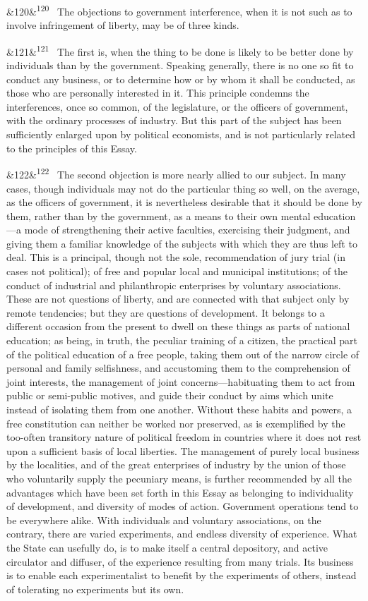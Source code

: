 \documentclass[12pt]{article}
\newcommand{\para}[1][]{\par\noindent\ifx&#1&\else\textsuperscript{\footnotesize #1}~\fi}
\begin{document}
\para[120] The objections to government interference, when it is not such as to involve infringement of liberty, may be of three kinds.

\para[121] The first is, when the thing to be done is likely to be better done by individuals than by the government. Speaking generally, there is no one so fit to conduct any business, or to determine how or by whom it shall be conducted, as those who are personally interested in it. This principle condemns the interferences, once so common, of the legislature, or the officers of government, with the ordinary processes of industry. But this part of the subject has been sufficiently enlarged upon by political economists, and is not particularly related to the principles of this Essay.

\para[122] The second objection is more nearly allied to our subject. In many cases, though individuals may not do the particular thing so well, on the average, as the officers of government, it is nevertheless desirable that it should be done by them, rather than by the government, as a means to their own mental education---a mode of strengthening their active faculties, exercising their judgment, and giving them a familiar knowledge of the subjects with which they are thus left to deal. This is a principal, though not the sole, recommendation of jury trial (in cases not political); of free and popular local and municipal institutions; of the conduct of industrial and philanthropic enterprises by voluntary associations. These are not questions of liberty, and are connected with that subject only by remote tendencies; but they are questions of development. It belongs to a different occasion from the present to dwell on these things as parts of national education; as being, in truth, the peculiar training of a citizen, the practical part of the political education of a free people, taking them out of the narrow circle of personal and family selfishness, and accustoming them to the comprehension of joint interests, the management of joint concerns---habituating them to act from public or semi-public motives, and guide their conduct by aims which unite instead of isolating them from one another. Without these habits and powers, a free constitution can neither be worked nor preserved, as is exemplified by the too-often transitory nature of political freedom in countries where it does not rest upon a sufficient basis of local liberties. The management of purely local business by the localities, and of the great enterprises of industry by the union of those who voluntarily supply the pecuniary means, is further recommended by all the advantages which have been set forth in this Essay as belonging to individuality of development, and diversity of modes of action. Government operations tend to be everywhere alike. With individuals and voluntary associations, on the contrary, there are varied experiments, and endless diversity of experience. What the State can usefully do, is to make itself a central depository, and active circulator and diffuser, of the experience resulting from many trials. Its business is to enable each experimentalist to benefit by the experiments of others, instead of tolerating no experiments but its own.
\end{document}
